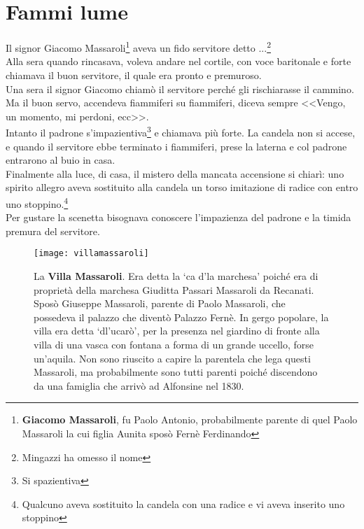 
\chapter{Fammi lume}
Il signor Giacomo Massaroli\footnote{\textbf{Giacomo Massaroli}, fu Paolo Antonio, probabilmente parente di quel  Paolo Massaroli la cui figlia Aunita sposò Fernè Ferdinando} aveva un fido servitore detto ...\footnote{Mingazzi ha omesso il nome}\\
Alla sera quando rincasava, voleva andare nel cortile, con voce baritonale e forte chiamava il buon servitore, il quale era pronto e premuroso.\\
\indent Una sera il signor Giacomo chiamò il servitore perché gli rischiarasse il cammino. Ma il buon servo, accendeva fiammiferi su fiammiferi, diceva sempre <<Vengo, un momento, mi perdoni, ecc>>.\\
\indent Intanto il padrone s'impazientiva\footnote{Si spazientiva} e chiamava più forte. La candela non si accese, e quando il servitore ebbe terminato i fiammiferi, prese la laterna e col padrone entrarono al buio in casa.\\
\indent Finalmente alla luce, di casa, il mistero della mancata accensione si chiarì: uno spirito allegro aveva sostituito alla candela un torso imitazione di radice con entro uno stoppino.\footnote{Qualcuno aveva sostituito la candela con una radice e vi aveva inserito uno stoppino}\\
\indent Per gustare la scenetta bisognava conoscere l'impazienza del padrone e la timida premura del servitore.


\begin{figure}[htb]
    \centering
    \texttt{[image: villamassaroli]}
    \caption[Villa Massaroli (1940)]{
    	La \textbf{Villa Massaroli}. Era detta la `ca d'la marchesa' poiché era di proprietà della marchesa Giuditta Passari Massaroli da Recanati. Sposò Giuseppe Massaroli, parente di Paolo Massaroli, che possedeva il palazzo che diventò Palazzo Fernè. In gergo popolare, la villa era detta `dl'ucarò', per la presenza nel giardino di fronte alla villa di una vasca con fontana a forma di un grande uccello, forse un’aquila. Non sono riuscito a capire la parentela che lega questi Massaroli, ma probabilmente sono tutti parenti poiché discendono da una famiglia che arrivò ad Alfonsine nel 1830. 
    \label{fig:villamassaroli}
    }
\end{figure}